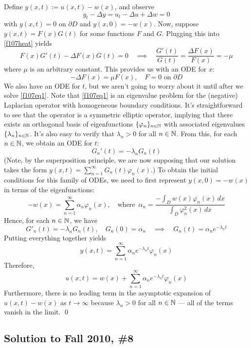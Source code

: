 Define $y(x,t) := u(x,t) - w(x)$, and observe
\begin{equation}
\label{f107heat}
	y_t - \Delta y = u_t - \Delta u + \Delta w = 0
\end{equation}
with $y(x,t) = 0$ on $\partial D$ and $y(x,0) = -w(x)$. Now, suppose $y(x,t) = F(x)G(t)$ for some functions $F$ and $G$. Plugging this into \eqref{f107heat} yields
$$ F(x) G'(t) - \Delta F(x) G(t) = 0 \quad \implies \quad \frac{G'(t)}{G(t)} = \frac{ \Delta F(x)}{F(x)} = -\mu $$
where $\mu$ is an arbitrary constant. This provides us with an ODE for $x$:
\begin{equation}
\label{f107eq1}
-\Delta F(x) = \mu F(x), \quad F = 0 \,\, \text{on} \,\, \partial D
\end{equation}	
We also have an ODE for $t$, but we aren't going to worry about it until after we solve \eqref{f107eq1}. Note that \eqref{f107eq1} is an eigenvalue problem for the (negative) Laplacian operator with homogeneous boundary conditions. It's straightforward to see that the operator is a symmetric elliptic operator, implying that there exists an orthogonal basis of eigenfunctions $\{\varphi_n\}_{n \in \mathbb{N}}$ with associated eigenvalues $\{ \lambda_n \}_{n \in \mathbb{N}}$. It's also easy to verify that $\lambda_n > 0$ for all $n \in \mathbb{N}$. From this, for each $n \in \mathbb{N}$, we obtain an ODE for $t$:
$$ G_n'(t) = -\lambda_n G_n(t) $$
(Note, by the superposition principle, we are now supposing that our solution takes the form $y(x,t) = \sum_{n=1}^{\infty} G_n(t) \varphi_n(x)$.) To obtain the initial conditions for this family of ODEs, we need to first represent $y(x,0) = -w(x)$ in terms of the eigenfunctions:
$$ -w(x) = \sum_{n=1}^{\infty} \alpha_n \varphi_n(x), \quad \text{where} \,\,\, \alpha_n = \frac{-\int_D w(x) \varphi_n(x) \, dx}{\int_D \varphi_n^2(x) \, dx} $$
Hence, for each $n \in \mathbb{N}$, we have
$$ G'_n(t) = -\lambda_n G_n(t), \quad G_n(0) = \alpha_n \quad \implies \quad G_n(t) = \alpha_n e^{-\lambda_n t} $$
Putting everything together yields
$$ y(x,t) = \sum_{n=1}^{\infty} \alpha_n e^{-\lambda_n t} \varphi_n(x) $$
Therefore,
$$ u(x,t) = w(x) + \sum_{n=1}^{\infty} \alpha_n e^{-\lambda_n t} \varphi_n(x) $$
Furthermore, there is no leading term in the asymptotic expansion of $u(x,t) - w(x)$ as $t \to \infty$ because $\lambda_n > 0$ for all $n \in \mathbb{N}$ --- all of the terms vanish in the limit. \hfill \qed



\subsection*{Solution to Fall 2010, \#8}
\label{F10Q8}

